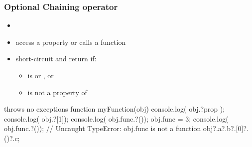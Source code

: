 \begin{frame}[fragile]
  \frametitle{Optional Chaining operator}
  \begin{itemize}
    \item {}
    \item access a property or calls a function
    \item short-circuit and return  if:
    \begin{itemize}
      \item {} is  or , or
      \item {} is not a property of 
    \end{itemize}
  \end{itemize}
\begin{CodeBox}{throws no exceptions}
  function myFunction(obj) {
    console.log( obj.?prop );
    console.log( obj.?[1]);
    console.log( obj.func.?());
    obj.func = 3;
    console.log( obj.func.?());
    // Uncaught TypeError: obj.func is not a function
    obj?.a?.b?.[0]?.()?.c;
  }
\end{CodeBox}

\end{frame}



